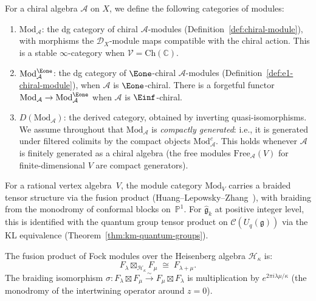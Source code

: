 \begin{definition}\label{def:module-categories}
For a chiral algebra $\mathcal{A}$ on $X$, we define the following
categories of modules:
\begin{enumerate}[label=(\roman*)]
\item $\mathrm{Mod}_{\mathcal{A}}$: the dg category of chiral
   $\mathcal{A}$-modules (Definition~\ref{def:chiral-module}),
   with morphisms the $\mathcal{D}_X$-module maps compatible with
   the chiral action.  This is a stable $\infty$-category when
   $\mathcal{V} = \mathrm{Ch}(\mathbb{C})$.
\item $\mathrm{Mod}^{\Eone}_{\mathcal{A}}$: the dg category of
   $\Eone$-chiral $\mathcal{A}$-modules
   (Definition~\ref{def:e1-chiral-module}), when $\mathcal{A}$ is
   $\Eone$-chiral.  There is a forgetful functor
   $\mathrm{Mod}_{\mathcal{A}} \to
   \mathrm{Mod}^{\Eone}_{\mathcal{A}}$ when $\mathcal{A}$ is
   $\Einf$-chiral.
\item $D(\mathrm{Mod}_{\mathcal{A}})$: the derived category,
   obtained by inverting quasi-isomorphisms.  We assume throughout
   that $\mathrm{Mod}_{\mathcal{A}}$ is \emph{compactly generated}:
   i.e., it is generated under filtered colimits by the compact
   objects $\mathrm{Mod}_{\mathcal{A}}^c$.  This holds whenever
   $\mathcal{A}$ is finitely generated as a chiral algebra
   (the free modules
   $\mathrm{Free}_{\mathcal{A}}(V)$ for finite-dimensional $V$
   are compact generators).
\end{enumerate}
\end{definition}

\begin{remark}
\label{rem:tensor-structure-modules}
For a rational vertex algebra~$V$, the module category $\mathrm{Mod}_V$ carries a braided tensor structure via the fusion product (Huang--Lepowsky--Zhang~\cite{HLZ}), with braiding from the monodromy of conformal blocks on~$\mathbb{P}^1$.  For $\widehat{\mathfrak{g}}_k$ at positive integer level, this is identified with the quantum group tensor product on $\mathcal{C}(U_q(\mathfrak{g}))$ via the KL equivalence (Theorem~\ref{thm:km-quantum-groups}).
\end{remark}

\begin{proposition}
\label{prop:fock-fusion-product}
The fusion product of Fock modules over the Heisenberg algebra
$\mathcal{H}_\kappa$ is:
\[
F_\lambda \boxtimes_{\mathcal{H}_\kappa} F_\mu
\;\cong\; F_{\lambda + \mu}.
\]
The braiding isomorphism
$\sigma: F_\lambda \boxtimes F_\mu \xrightarrow{\sim}
F_\mu \boxtimes F_\lambda$
is multiplication by $e^{2\pi i \lambda\mu/\kappa}$
\textup{(}the monodromy of the intertwining operator around
$z = 0$\textup{)}.
\end{proposition}

